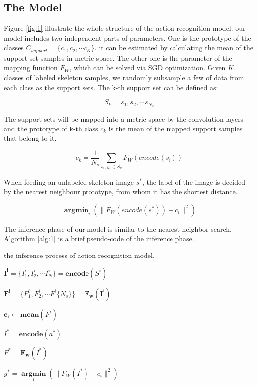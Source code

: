 \documentclass{bmvc2k}
\begin{document}
\subsection*{The Model}
Figure \ref{fig:1} illustrate the whole structure of the action recognition model. our model includes two independent parts of parameters. One is the prototype of the classes $C_{support}=\{c_1,c_2,\cdots c_K\}$. it can be estimated by calculating the mean of the support set samples in metric space. The other one is the parameter of the mapping function $F_W$, which can be solved via SGD optimization. Given $K$ classes of labeled skeleton samples, we randomly subsample a few of data from each class as the support sets. The k-th support set can be defined as:

$$S_k=s_1,s_2,\cdots s_{N_s}$$

The support sets will be mapped into a metric space by the convolution layers and the prototype of k-th class $c_k$ is the mean of the mapped support samples that belong to it. 

$$c_k=\frac{1}{N_s} \sum \limits_{s_i,y_i\in S_k}F_W (encode(s_i))$$

When feeding an unlabeled skeleton image $s^*$, the label of the image is decided by the nearest neighbour prototype, from whom it has the shortest distance.

$$\mathop{\mathbf{argmin}}_{i} ( \lVert F_W ( encode(s^\ast) ) - c_i \rVert^2 )$$

The inference phase of our model is similar to the nearest neighbor search. Algorithm \ref{alg:1} is a brief pseudo-code of the inference phase.


\begin{algorithm}
	\caption{ the inference process of action recognition model.}
	\label{alg:1}
	{
		
		$\mathbf{I^i}=\{I^i_1,I^i_2,\cdots I^i_N\}=\mathbf{encode}(S^i)$
		
		$\mathbf{F^i}=\{F^i_1,F^i_2,\cdots F^i \{ N_s \} \}=\mathbf{F_w(I^i)}$
		
		$\mathbf{c_i}\leftarrow \mathbf{mean}(F^i)$
		
	}
	
	$I^\ast = \mathbf{encode}(a^\ast) $
	
	$F^\ast = \mathbf{F_w}(I^\ast)$
	
	$y^\ast=\mathop{\mathbf{argmin}}\limits_{\mathbf{i}} \left( \lVert F_W \left( I^\ast \right) - c_i \rVert^2 \right)$
\end{algorithm}
\end{document}
